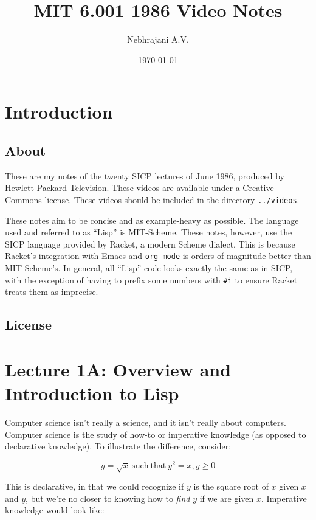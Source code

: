 \documentclass[9pt]{report}
\author{Nebhrajani A.V.}
\date{\today}
\title{MIT 6.001 1986 Video Notes}
\begin{document}
\maketitle
\tableofcontents


\chapter{Introduction}
\label{sec:org5149e99}

\section{About}
\label{sec:org705de57}
These are my notes of the twenty SICP lectures of June 1986,
produced by Hewlett-Packard Television. These videos are available
under a Creative Commons license. These videos should be included in
the directory \texttt{../videos}.

These notes aim to be concise and as example-heavy as possible. The
language used and referred to as ``Lisp'' is MIT-Scheme. These notes,
however, use the SICP language provided by Racket, a modern Scheme
dialect. This is because Racket's integration with Emacs and
\texttt{org-mode} is orders of magnitude better than MIT-Scheme's. In
general, all ``Lisp'' code looks exactly the same as in SICP, with the
exception of having to prefix some numbers with \texttt{\#i} to ensure
Racket treats them as imprecise.

\section{License}
\label{sec:org0786e02}
\doclicenseThis

\chapter{Lecture 1A: Overview and Introduction to Lisp}
\label{sec:orge2f5405}

Computer science isn't really a science, and it isn't really about
computers. Computer science is the study of how-to or imperative
knowledge (as opposed to declarative knowledge). To illustrate the
difference, consider:

$$y = \sqrt{x} \mathrm{~such~that~} y^2=x, y \geq 0$$

This is declarative, in that we could recognize if \(y\) is the square
root of \(x\) given \(x\) and \(y\), but we're no closer to knowing how to
\emph{find} \(y\) if we are given \(x\). Imperative knowledge would look
like:
\end{document}
